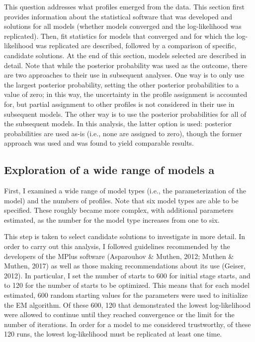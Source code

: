 \documentclass[]{msu-thesis}
\theoremstyle{definition}
\theoremstyle{definition}
\theoremstyle{definition}
\theoremstyle{remark}
\begin{document}
This question addresses what profiles emerged from the data. This
section first provides information about the statistical software that
was developed and solutions for all models (whether models converged and
the log-likelihood was replicated). Then, fit statistics for models that
converged and for which the log-likelihood was replicated are described,
followed by a comparison of specific, candidate solutions. At the end of
this section, models selected are described in detail. Note that while
the posterior probability was used as the outcome, there are two
approaches to their use in subsequent analyses. One way is to only use
the largest posterior probability, setting the other posterior
probabilities to a value of zero; in this way, the uncertainty in the
profile assignment is accounted for, but partial assignment to other
profiles is not considered in their use in subsequent models. The other
way is to use the posterior probabilities for all of the subsequent
models. In this analysis, the latter option is used: posterior
probabilities are used as-is (i.e., none are assigned to zero), though
the former approach was used and was found to yield comparable results.

\subsection{Exploration of a wide range of models
a}\label{exploration-of-a-wide-range-of-models-a}

First, I examined a wide range of model types (i.e., the
parameterization of the model) and the numbers of profiles. Note that
six model types are able to be specified. These roughly became more
complex, with additional parameters estimated, as the number for the
model type increases from one to six.

This step is taken to select candidate solutions to investigate in more
detail. In order to carry out this analysis, I followed guidelines
recommended by the developers of the MPlus software (Asparouhov \&
Muthen, 2012; Muthen \& Muthen, 2017) as well as those making
recommendations about its use (Geiser, 2012). In particular, I set the
number of starts to 600 for initial stage starts, and to 120 for the
number of starts to be optimized. This means that for each model
estimated, 600 random starting values for the parameters were used to
initialize the EM algorithm. Of these 600, 120 that demonstrated the
lowest log-likelihood were allowed to continue until they reached
convergence or the limit for the number of iterations. In order for a
model to me considered trustworthy, of these 120 runs, the lowest
log-likelihood must be replicated at least one time.
\end{document}
